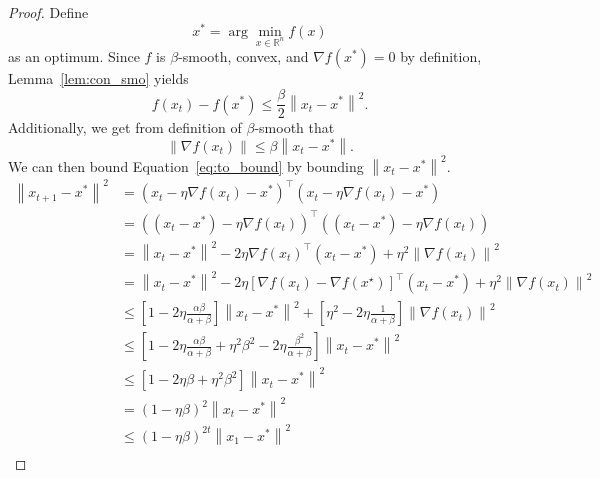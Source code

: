 \documentclass{article}
\newcommand{\R}{\mathbb R}
\newcommand{\norm}[1]{\left\| #1 \right\| }
\theoremstyle{definition}
\begin{document}
\begin{proof}
    Define
    \begin{equation}
        x^* = \arg \min_{x \in \R^n} f(x)
    \end{equation} as an optimum.
    Since $f$ is $\beta$-smooth, convex, and
    $\nabla f(x^*) = 0$ by definition, Lemma~\ref{lem:con_smo} yields
    \begin{equation}
        \label{eq:to_bound}
        f(x_t) - f(x^*) \leq \frac{\beta}{2} \norm{x_t - x^*}^2.
    \end{equation}
    Additionally, we get from definition of $\beta$-smooth that 
    \begin{equation}
        \norm{\nabla f(x_t)} \leq \beta \norm{x_t - x^*}.
    \end{equation}
    We can then bound Equation~\ref{eq:to_bound} by bounding $\norm{x_t - x^*}^2$.
    \begin{equation}
        \begin{aligned}
            \norm{x_{t + 1} - x^*}^2 &= {\left( x_{t} - \eta \nabla f(x_t) - x^*
            \right)}^\intercal \left( x_{t} - \eta \nabla f(x_t) - x^* \right)
            \\
            &= {\left( (x_{t} - x^*) - \eta \nabla f(x_t) 
            \right)}^\intercal \left( (x_{t}-x^*) - \eta \nabla f(x_t) \right)
            \\
            &= \norm{x_t - x^*}^2 - 2\eta {\nabla
            f(x_t)}^\intercal (x_t - x^*) + \eta^2 \norm{\nabla f(x_t)}^2 \\
            &= \norm{x_t - x^*}^2 - 2\eta {[\nabla
            f(x_t) - \nabla f(x^\star)]}^\intercal (x_t - x^*) + \eta^2
            \norm{\nabla f(x_t)}^2 \\
            &\leq \left[ 1 - 2\eta \frac{\alpha \beta}{\alpha + \beta}
            \right]\norm{x_t - x^*}^2 + \left[  \eta^2  - 2\eta\frac{1}{\alpha +
            \beta} \right]\norm{\nabla f(x_t)}^2\\
            &\leq \left[ 1 - 2\eta \frac{\alpha \beta}{\alpha + \beta}
              + \eta^2\beta^2  - 2\eta\frac{\beta^2}{\alpha +
            \beta} \right]\norm{x_t - x^*}^2 \\
            &\leq \left[ 1 - 2\eta \beta 
              + \eta^2\beta^2  \right]\norm{x_t - x^*}^2 \\
            &= {\left( 1 -  \eta\beta  \right)}^2\norm{x_t - x^*}^2 \\
            &\leq {\left( 1 -  \eta\beta  \right)}^{2t}\norm{x_1 - x^*}^2 \\
        \end{aligned}
    \end{equation}
\end{proof}
\end{document}
